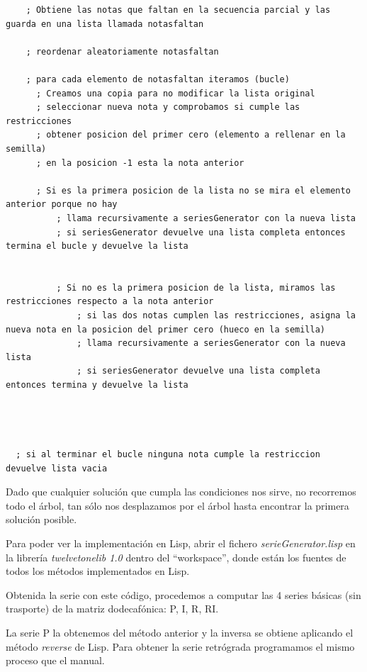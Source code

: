 \documentclass[a4paper,openany,oneside,12pt]{book}
\begin{document}
   \lstset{language=Lisp,
           basicstyle=\ttfamily\scriptsize,
           keywordstyle=\ttfamily,
           stringstyle=\ttfamily,
           commentstyle=\ttfamily,
          breaklines=true
          }
\begin{lstlisting}
    ; Obtiene las notas que faltan en la secuencia parcial y las guarda en una lista llamada notasfaltan

    ; reordenar aleatoriamente notasfaltan

  	; para cada elemento de notasfaltan iteramos (bucle)
      ; Creamos una copia para no modificar la lista original
      ; seleccionar nueva nota y comprobamos si cumple las restricciones
      ; obtener posicion del primer cero (elemento a rellenar en la semilla)
      ; en la posicion -1 esta la nota anterior
      
      ; Si es la primera posicion de la lista no se mira el elemento anterior porque no hay
          ; llama recursivamente a seriesGenerator con la nueva lista
          ; si seriesGenerator devuelve una lista completa entonces termina el bucle y devuelve la lista


          ; Si no es la primera posicion de la lista, miramos las restricciones respecto a la nota anterior
              ; si las dos notas cumplen las restricciones, asigna la nueva nota en la posicion del primer cero (hueco en la semilla)
              ; llama recursivamente a seriesGenerator con la nueva lista
              ; si seriesGenerator devuelve una lista completa entonces termina y devuelve la lista




  ; si al terminar el bucle ninguna nota cumple la restriccion devuelve lista vacia

\end{lstlisting}

Dado que cualquier solución que cumpla las condiciones nos sirve, no recorremos todo el árbol, tan sólo nos desplazamos por el árbol hasta encontrar la primera solución posible.

Para poder ver la implementación en Lisp, abrir el fichero \emph{serieGenerator.lisp} en la librería \emph{twelvetonelib 1.0} dentro del ``workspace'', donde están los fuentes de todos los métodos implementados en Lisp.

Obtenida la serie con este código, procedemos a computar las 4 series básicas (sin trasporte) de la matriz dodecafónica: P, I, R, RI.

La serie P la obtenemos del método anterior y la inversa se obtiene aplicando el método \emph{reverse} de Lisp. Para obtener la serie retrógrada programamos el mismo proceso que el manual.
\end{document}
